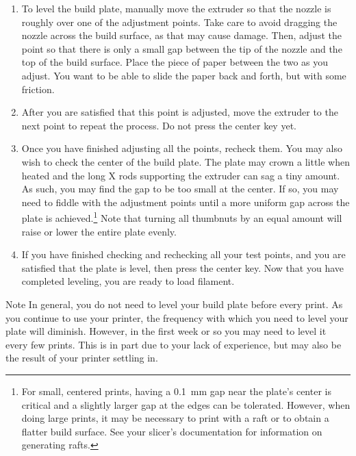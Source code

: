 \begin{enumerate}
\item To level the build plate, manually move the extruder so that the nozzle is roughly over one of the adjustment points.  Take care to avoid dragging the nozzle across the build surface, as that may cause damage.  Then, adjust the point so that there is only a small gap between the tip of the nozzle and the top of the build surface.  Place the piece of paper between the two as you adjust.  You want to be able to slide the paper back and forth, but with some friction.
\item After you are satisfied that this point is adjusted, move the extruder to the next point to repeat the process.  Do not press the center key yet.
\item Once you have finished adjusting all the points, recheck them.  You may also wish to check the center of the build plate.  The plate may crown a little when heated and the long X rods supporting the extruder can sag a tiny amount.  As such, you may find the gap to be too small at the center.  If so, you may need to fiddle with the adjustment points until a more uniform gap across the plate is achieved.\footnote{For small, centered prints, having a 0.1~mm gap near the plate's center is critical and a slightly larger gap at the edges can be tolerated.  However, when doing large prints, it may be necessary to print with a \gls{raft} or to obtain a flatter build surface.  See your slicer's documentation for information on generating rafts.}  Note that turning all thumbnuts by an equal amount will raise or lower the entire plate evenly.
\item If you have finished checking and rechecking all your test points, and you are satisfied that the plate is level, then press the center key.  Now that you have completed leveling, you are ready to load filament.
\end{enumerate}

\begin{bclogo}[logo=\bcinfo, noborder=true, couleurBarre=yellow]{Note}
In general, you do not need to level your build plate before every print.  As you continue to use your printer, the frequency with which you need to level your plate will diminish.  However, in the first week or so you may need to level it every few prints.  This is in part due to your lack of experience, but may also
be the result of your printer settling in.
\end{bclogo}


